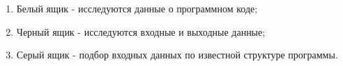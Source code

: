 \begin{enumerate}
\item Белый ящик - исследуются данные о программном коде;
\item Черный ящик - исследуются входные и выходные данные;
\item Серый ящик - подбор входных данных по известной структуре программы.
\end{enumerate}
